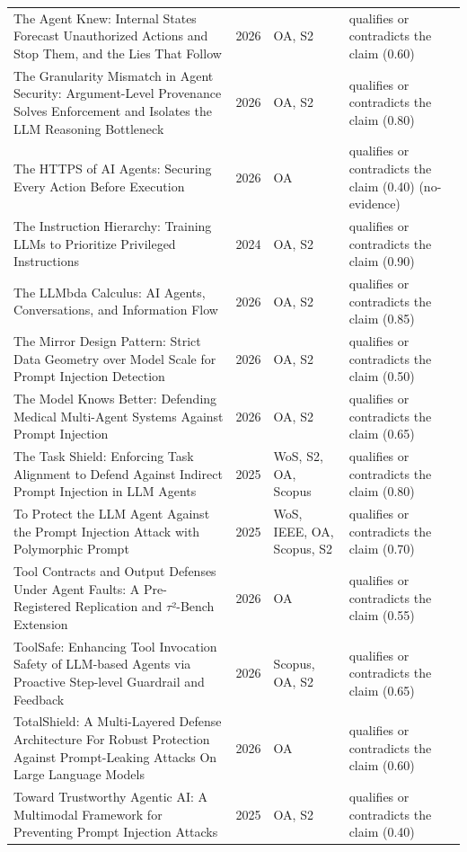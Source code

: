 \begin{longtable}{@{}%
  >{\raggedright\arraybackslash}p{}c%
  >{\raggedright\arraybackslash}p{}%
  >{\raggedright\arraybackslash}p{}@{}}
The Agent Knew: Internal States Forecast Unauthorized Actions and Stop Them, and the Lies That Follow & 2026 & OA, S2 & qualifies or contradicts the claim (0.60) \\
The Granularity Mismatch in Agent Security: Argument-Level Provenance Solves Enforcement and Isolates the LLM Reasoning Bottleneck & 2026 & OA, S2 & qualifies or contradicts the claim (0.80) \\
The HTTPS of AI Agents: Securing Every Action Before Execution & 2026 & OA & qualifies or contradicts the claim (0.40) (no-evidence) \\
The Instruction Hierarchy: Training LLMs to Prioritize Privileged Instructions & 2024 & OA, S2 & qualifies or contradicts the claim (0.90) \\
The LLMbda Calculus: AI Agents, Conversations, and Information Flow & 2026 & OA, S2 & qualifies or contradicts the claim (0.85) \\
The Mirror Design Pattern: Strict Data Geometry over Model Scale for Prompt Injection Detection & 2026 & OA, S2 & qualifies or contradicts the claim (0.50) \\
The Model Knows Better: Defending Medical Multi-Agent Systems Against Prompt Injection & 2026 & OA, S2 & qualifies or contradicts the claim (0.65) \\
The Task Shield: Enforcing Task Alignment to Defend Against Indirect Prompt Injection in LLM Agents & 2025 & WoS, S2, OA, Scopus & qualifies or contradicts the claim (0.80) \\
To Protect the LLM Agent Against the Prompt Injection Attack with Polymorphic Prompt & 2025 & WoS, IEEE, OA, Scopus, S2 & qualifies or contradicts the claim (0.70) \\
Tool Contracts and Output Defenses Under Agent Faults: A Pre-Registered Replication and \ensuremath{\tau}²-Bench Extension & 2026 & OA & qualifies or contradicts the claim (0.55) \\
ToolSafe: Enhancing Tool Invocation Safety of LLM-based Agents via Proactive Step-level Guardrail and Feedback & 2026 & Scopus, OA, S2 & qualifies or contradicts the claim (0.65) \\
TotalShield: A Multi-Layered Defense Architecture For Robust Protection Against Prompt-Leaking Attacks On Large Language Models & 2026 & OA & qualifies or contradicts the claim (0.60) \\
Toward Trustworthy Agentic AI: A Multimodal Framework for Preventing Prompt Injection Attacks & 2025 & OA, S2 & qualifies or contradicts the claim (0.40) \\

\end{longtable}
